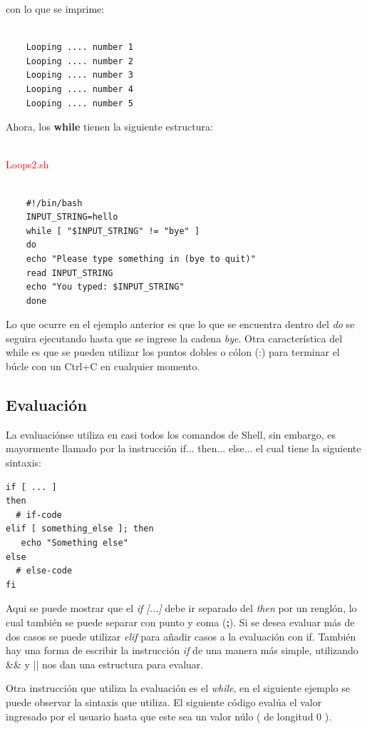 \documentclass{article}
\begin{document}
con lo que se imprime:
\begin{verbatim}
	
    Looping .... number 1
    Looping .... number 2
    Looping .... number 3
    Looping .... number 4
    Looping .... number 5
\end{verbatim}

Ahora, los \textbf{while} tienen la siguiente estructura:

~\\
\textcolor{red}{Loops2.sh}
\begin{framed}
\begin{verbatim}
	
    #!/bin/bash
    INPUT_STRING=hello
    while [ "$INPUT_STRING" != "bye" ]
    do
    echo "Please type something in (bye to quit)"
    read INPUT_STRING
    echo "You typed: $INPUT_STRING"
    done
\end{verbatim}
\end{framed}

Lo que ocurre en el ejemplo anterior es que lo que se encuentra dentro del \textit{do} se seguira ejecutando hasta que se ingrese la cadena \textit{bye}.
Otra característica del while es que se pueden utilizar los puntos dobles o cólon (:) para terminar el búcle con un Ctrl+C en cualquier momento.

\subsection{Evaluación}

La evaluaciónse utiliza en casi todos los comandos de Shell, sin embargo, es mayormente llamado por la instrucción if... then... else... el cual tiene la siguiente sintaxis:

\begin{verbatim}
if [ ... ]
then
  # if-code
elif [ something_else ]; then
   echo "Something else"
else
  # else-code
fi
\end{verbatim}

Aqui se puede mostrar que el \textit{if [...]} debe ir separado del \textit{then} por un renglón, lo cual también se puede separar con punto y coma (\textbf{;}). Si se desea evaluar más de dos casos se puede utilizar \textit{elif} para añadir casos a la evaluación con if. También hay una forma de escribir la instrucción \textit{if} de una manera más simple, utilizando \&\& y || nos dan una estructura para evaluar.

\newpage

Otra instrucción que utiliza la evaluación es el \textit{while}, en el siguiente ejemplo se puede observar la sintaxis que utiliza.
El siguiente código evalúa el valor ingresado por el usuario hasta que este sea un valor núlo ( de longitud 0 ).
\end{document}
